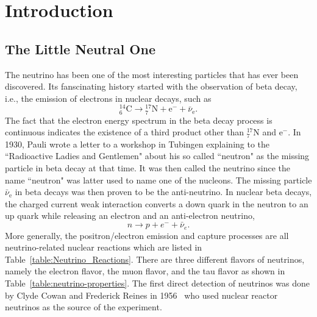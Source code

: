 \chapter{Introduction}
\label{introduction}

\section{The Little Neutral One}

The neutrino has been one of the most interesting particles that has ever been discovered. Its fanscinating history started with the observation of beta decay, i.e., the emission of electrons in nuclear decays, such as
\begin{equation*}
{}^{14}_{6} \mathrm C \to {}^{17}_{7}\mathrm N + \mathrm e^{-} + \bar\nu_{\mathrm e}.
\end{equation*}
The fact that the electron energy spectrum in the beta decay process is continuous indicates the existence of a third product other than ${}^{17}_{7}\mathrm N$ and $\mathrm e^-$. In 1930, Pauli wrote a letter to a workshop in Tubingen explaining to the ``Radioactive Ladies and Gentlemen" about his so called ``neutron" as the missing particle in beta decay at that time. It was then called the neutrino since the name ``neutron" was latter used to name one of the nucleons. The missing particle $\bar\nu_{\mathrm e}$ in beta decays was then proven to be the anti-neutrino. In nuclear beta decays, the charged current weak interaction converts a down quark in the neutron to an up quark while releasing an electron and an anti-electron neutrino,
\begin{equation}
n\to p + e^- + \bar \nu_e .
\end{equation}
More generally, the positron/electron emission and capture processes are all neutrino-related nuclear reactions which are listed in Table~\ref{table:Neutrino_Reactions}. There are three different flavors of neutrinos, namely the electron flavor, the muon flavor, and the tau flavor as shown in Table~\ref{table:neutrino-properties}. The first direct detection of neutrinos was done by Clyde Cowan and Frederick Reines in 1956~\cite{Cowan1956} who used nuclear reactor neutrinos as the source of the experiment.

